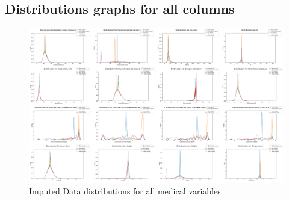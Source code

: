 \documentclass{l4proj}
\begin{document}
\begin{appendices}
\section{Distributions graphs for all columns}
\label{appendix:distributions}
 \begin{figure}[!h]
  \caption{Imputed Data distributions for all medical variables}
  \includegraphics[width=\textwidth]{dissertation/Latex/images/distributions.PNG}
\end{figure}






\end{appendices}






\end{document}
